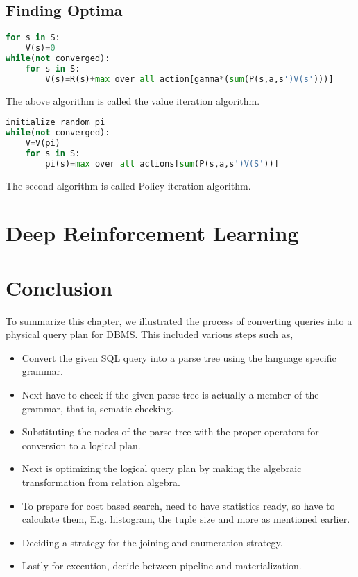 \subsection{Finding Optima}
\begin{lstlisting}[language=python]
for s in S:
    V(s)=0
while(not converged):
    for s in S:
        V(s)=R(s)+max over all action[gamma*(sum(P(s,a,s')V(s')))]
\end{lstlisting}
The above algorithm is called the value iteration algorithm\cite{solving_rl}.
\begin{lstlisting}[language=python]
initialize random pi
while(not converged):
    V=V(pi)
    for s in S:
        pi(s)=max over all actions[sum(P(s,a,s')V(S'))]
\end{lstlisting}
The second algorithm is called Policy iteration algorithm\cite{solving_rl}.

\section{Deep Reinforcement Learning}


\section{Conclusion}
To summarize this chapter, we illustrated the process of converting queries into a physical query plan for DBMS. This included various steps such as, 
\begin{itemize}
    \item Convert the given SQL query into a parse tree using the language specific grammar.
    \item Next have to check if the given parse tree is actually a member of the grammar, that is, sematic checking.
    \item Substituting the nodes of the parse tree with the proper operators for conversion to a logical plan.
    \item Next is optimizing the logical query plan by making the algebraic transformation from relation algebra.
    \item To prepare for cost based search, need to have statistics ready, so have to calculate them, E.g. histogram, the tuple size and more as mentioned earlier.
    \item Deciding a strategy for the joining and enumeration strategy.
    \item Lastly for execution, decide between pipeline and materialization.
\end{itemize}

